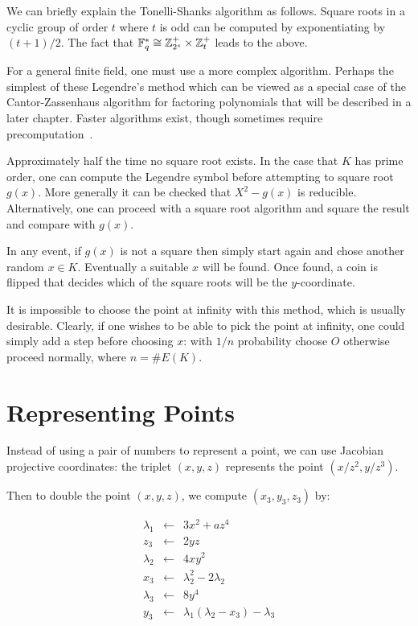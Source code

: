 We can briefly explain the Tonelli-Shanks algorithm as follows.
Square roots in a cyclic group of order $t$ where $t$ is odd can be
computed by exponentiating by $(t+1)/2$.
The fact that $\mathbb{F}_q^* \cong \mathbb{Z}_{2^s}^+
\times \mathbb{Z}_t^+$ leads to the above.

For a general finite field,
one must use a more complex algorithm. Perhaps the simplest of these
Legendre's method which can be viewed as a special
case of the Cantor-Zassenhaus algorithm for factoring polynomials that
will be described in a later chapter.
Faster algorithms exist, though sometimes require precomputation~\cite{djb}.

Approximately half the time no square root exists.
In the case that $K$ has prime order,
one can compute the Legendre symbol before attempting to square root $g(x)$.
More generally it can be checked that $X^2 - g(x)$ is reducible. Alternatively,
one can proceed with a square root algorithm and square the result and
compare with $g(x)$.

In any event, if $g(x)$ is not a square then simply start again and
chose another random $x \in K$. Eventually a suitable $x$ will be found.
Once found, a coin is flipped that decides which of the square roots will
be the $y$-coordinate.

It is impossible to choose the point at infinity with this method,
which is usually desirable. Clearly, if one wishes to be able to pick
the point at infinity, one could simply add a step before choosing $x$:
with $1/n$ probability choose $O$ otherwise proceed normally, where
$n = \#E(K)$.

\section {Representing Points}

Instead of using a pair of numbers to represent a point,
we can use Jacobian projective coordinates: the triplet
$(x,y,z)$ represents the point $(x/z^2, y/z^3)$.

Then to double the point $(x,y,z)$, we compute $(x_3, y_3, z_3)$ by:

\[
\begin{array}{rcl}
\lambda_1 & \leftarrow & 3x^2 + a z^4 \\
z_3 & \leftarrow & 2yz \\
\lambda_2 & \leftarrow & 4xy^2 \\
x_3 & \leftarrow & \lambda_2^2 - 2 \lambda_2 \\
\lambda_3 & \leftarrow & 8 y^4 \\
y_3 & \leftarrow & \lambda_1(\lambda_2 - x_3) - \lambda_3
\end{array}
\]


